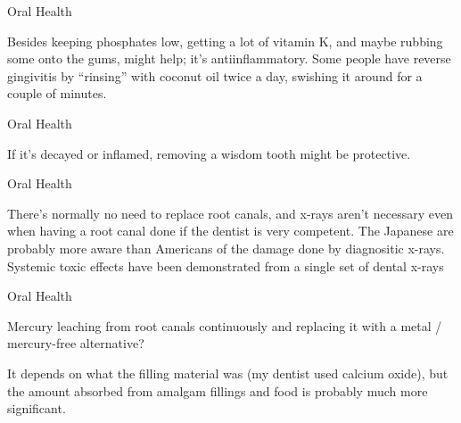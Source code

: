 \documentclass[11pt,oneside,openany,extrafontsizes]{memoir}
\begin{document}
\begin{standalonequote}{Oral Health}

    \begin{answer}
        Besides keeping phosphates low, getting a lot of vitamin K, and maybe rubbing some onto the gums, might help; it's antiinflammatory. Some people have reverse gingivitis by \enquote{rinsing} with coconut oil twice a day, swishing it around for a couple of minutes.
    \end{answer}
\end{standalonequote}

\begin{standalonequote}{Oral Health}

    \begin{answer}
        If it's decayed or inflamed, removing a wisdom tooth might be protective.
    \end{answer}
\end{standalonequote}

\begin{standalonequote}{Oral Health}

    \begin{answer}
        There's normally no need to replace root canals, and x-rays aren't necessary even when having a root canal done if the dentist is very competent. The Japanese are probably more aware than Americans of the damage done by diagnositic x-rays. Systemic toxic effects have been demonstrated from a single set of dental x-rays
    \end{answer}
\end{standalonequote}

\begin{qaexchange}{Oral Health}

    \begin{question}
        Mercury leaching from root canals continuously and replacing it with a metal / mercury-free alternative?
    \end{question}

    \begin{answer}
        It depends on what the filling material was (my dentist used calcium oxide), but the amount absorbed from amalgam fillings and food is probably much more significant.
    \end{answer}
\end{qaexchange}
\end{document}
